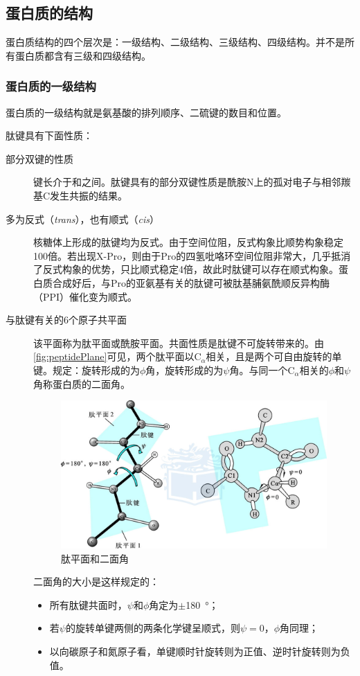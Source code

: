 \subsection{蛋白质的结构}

蛋白质结构的四个层次是：一级结构、二级结构、三级结构、四级结构。并不是所有蛋白质都含有三级和四级结构。

\subsubsection{蛋白质的一级结构}

蛋白质的一级结构就是氨基酸的排列顺序、二硫键的数目和位置。

肽键具有下面性质：
\begin{description}
	\item[部分双键的性质] 键长介于和之间。肽键具有的部分双键性质是酰胺N上的孤对电子与相邻羰基C发生共振的结果。
	\item[多为反式（\textit{trans}），也有顺式（\textit{cis}）] 核糖体上形成的肽键均为反式。由于空间位阻，反式构象比顺势构象稳定100倍。若出现X-Pro，则由于Pro的四氢吡咯环空间位阻非常大，几乎抵消了反式构象的优势，只比顺式稳定4倍，故此时肽键可以存在顺式构象。蛋白质合成好后，与Pro的亚氨基有关的肽键可被肽基脯氨酰顺反异构酶（PPI）催化变为顺式。
	\item[与肽键有关的6个原子共平面] 该平面称为肽平面或酰胺平面。共面性质是肽键不可旋转带来的。由\autoref{fig:peptidePlane}可见，两个肽平面以C$_{\alpha}$相关，且是两个可自由旋转的单键。规定：旋转形成的为$\phi$角，旋转形成的为$\psi$角。与同一个C$_{\alpha}$相关的$\phi$和$\psi$角称蛋白质的二面角。

	\begin{figure}[htbp]
		\centering
		\includegraphics[width=0.8\linewidth]{Pics/肽平面}
		\caption{肽平面和二面角}
		\label{fig:peptidePlane}
	\end{figure}

	二面角的大小是这样规定的：
	\begin{itemize}
		\item 所有肽键共面时，$\psi$和$\phi$角定为$\pm$\SI{180}{\degree}；
		\item 若$\psi$的旋转单键两侧的两条化学键呈顺式，则$\psi=0$，$\phi$角同理；
		\item 以向碳原子和氮原子看，单键顺时针旋转则为正值、逆时针旋转则为负值。
	\end{itemize}


\end{description}

